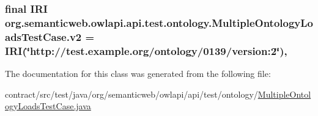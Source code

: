 \hypertarget{classorg_1_1semanticweb_1_1owlapi_1_1api_1_1test_1_1ontology_1_1_multiple_ontology_loads_test_case_a23e64b1f4eba4e669fc28265be67efad}{
\subsubsection[{v2}]{\setlength{\rightskip}{0pt plus 5cm}final {\bf I\-R\-I} org.\-semanticweb.\-owlapi.\-api.\-test.\-ontology.\-Multiple\-Ontology\-Loads\-Test\-Case.\-v2 = {\bf I\-R\-I}(\char`\"{}http\-://test.\-example.\-org/ontology/0139/version\-:2\char`\"{})\hspace{0.3cm}{\ttfamily [static]}, {\ttfamily [private]}}}\label{classorg_1_1semanticweb_1_1owlapi_1_1api_1_1test_1_1ontology_1_1_multiple_ontology_loads_test_case_a23e64b1f4eba4e669fc28265be67efad}


The documentation for this class was generated from the following file\-:\begin{DoxyCompactItemize}
\item 
contract/src/test/java/org/semanticweb/owlapi/api/test/ontology/\hyperlink{_multiple_ontology_loads_test_case_8java}{Multiple\-Ontology\-Loads\-Test\-Case.\-java}\end{DoxyCompactItemize}
